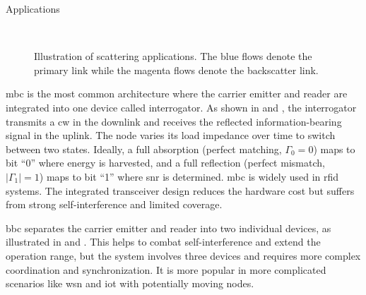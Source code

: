 \begin{section}{}
	\begin{subsection}{Applications}
		\begin{figure}[H]
			\centering
			\\
			\caption{
				Illustration of scattering applications.
				The blue flows denote the primary link while the magenta flows denote the backscatter link.
			}
		\end{figure}

		\begin{subsubsection}{}
			\gls{mbc} is the most common architecture where the carrier emitter and reader are integrated into one device called interrogator.
			As shown in  and , the interrogator transmits a \gls{cw} in the downlink and receives the reflected information-bearing signal in the uplink.
			The node varies its load impedance over time to switch between two states.
			Ideally, a full absorption (perfect matching, $\Gamma_0 = 0$) maps to bit ``0'' where energy is harvested, and a full reflection (perfect mismatch, $\lvert \Gamma_1 \rvert = 1$) maps to bit ``1'' where \gls{snr} is determined.
			\gls{mbc} is widely used in \gls{rfid} systems.
			The integrated transceiver design reduces the hardware cost but suffers from strong self-interference and limited coverage.
		\end{subsubsection}

		\begin{subsubsection}{}
			\gls{bbc} separates the carrier emitter and reader into two individual devices, as illustrated in  and .
			This helps to combat self-interference and extend the operation range, but the system involves three devices and requires more complex coordination and synchronization.
			It is more popular in more complicated scenarios like \gls{wsn} and \gls{iot} with potentially moving nodes.
		\end{subsubsection}


\end{subsection}
\end{section}

